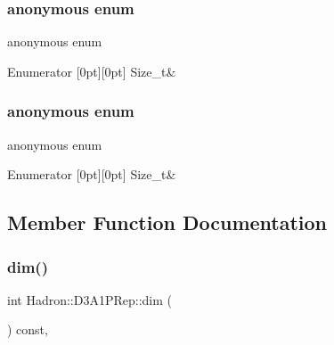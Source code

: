 \subsubsection{\texorpdfstring{anonymous enum}{anonymous enum}}
{\footnotesize\ttfamily anonymous enum}

\begin{DoxyEnumFields}{Enumerator}
[0pt][0pt]{}\mbox{\label{structHadron_1_1D3A1PRep_a2e04ad5ab60b4ce740666a6ce8f9cddba485e154be9386456862c1bc150852da8}} 
Size\+\_\+t&\\
\hline

\end{DoxyEnumFields}
\mbox{\label{structHadron_1_1D3A1PRep_a2e04ad5ab60b4ce740666a6ce8f9cddb}} 
\subsubsection{\texorpdfstring{anonymous enum}{anonymous enum}}
{\footnotesize\ttfamily anonymous enum}

\begin{DoxyEnumFields}{Enumerator}
[0pt][0pt]{}\mbox{\label{structHadron_1_1D3A1PRep_a2e04ad5ab60b4ce740666a6ce8f9cddba485e154be9386456862c1bc150852da8}} 
Size\+\_\+t&\\
\hline

\end{DoxyEnumFields}


\subsection{Member Function Documentation}
\mbox{\label{structHadron_1_1D3A1PRep_a250e3d75bd0193a38ca00df99dfd1936}} 
\subsubsection{\texorpdfstring{dim()}{dim()}\hspace{0.1cm}{\footnotesize\ttfamily [1/2]}}
{\footnotesize\ttfamily int Hadron\+::\+D3\+A1\+P\+Rep\+::dim (\begin{DoxyParamCaption}{ }\end{DoxyParamCaption}) const\hspace{0.3cm}{\ttfamily [inline]}, {\ttfamily [virtual]}}

